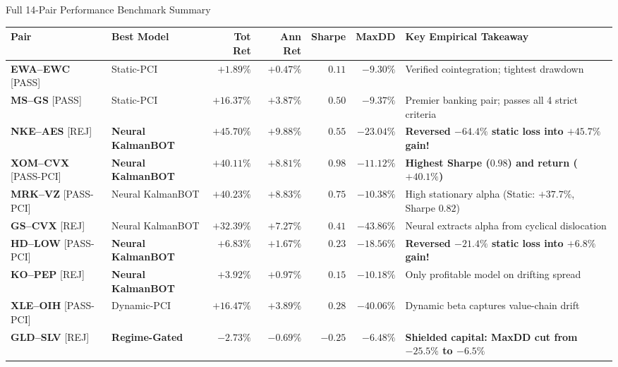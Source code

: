 \documentclass[10pt, aspectratio=169]{beamer}
\begin{document}
\begin{frame}{Full 14-Pair Performance Benchmark Summary}
  \scriptsize
  \setlength{\tabcolsep}{3pt}
  \begin{table}
    \centering
    \begin{tabular}{@{}llrrrrp{4.2cm}@{}}
      \toprule
      \textbf{Pair} & \textbf{Best Model} & \textbf{Tot Ret} & \textbf{Ann Ret} & \textbf{Sharpe} & \textbf{MaxDD} & \textbf{Key Empirical Takeaway} \\
      \midrule
      \textbf{EWA--EWC} [PASS] & Static-PCI & $\mathbf{+1.89\%}$ & $+0.47\%$ & $\mathbf{0.11}$ & $\mathbf{-9.30\%}$ & Verified cointegration; tightest drawdown \\
      \textbf{MS--GS} [PASS] & Static-PCI & $\mathbf{+16.37\%}$ & $+3.87\%$ & $\mathbf{0.50}$ & $\mathbf{-9.37\%}$ & Premier banking pair; passes all 4 strict criteria \\
      \midrule
      \textbf{NKE--AES} [REJ] & \textbf{Neural KalmanBOT} & $\mathbf{+45.70\%}$ & $+9.88\%$ & $\mathbf{0.55}$ & $\mathbf{-23.04\%}$ & \textbf{Reversed $-64.4\%$ static loss into $+45.7\%$ gain!} \\
      \textbf{XOM--CVX} [PASS-PCI] & \textbf{Neural KalmanBOT} & $\mathbf{+40.11\%}$ & $+8.81\%$ & $\mathbf{0.98}$ & $\mathbf{-11.12\%}$ & \textbf{Highest Sharpe ($0.98$) and return ($+40.1\%$)} \\
      \textbf{MRK--VZ} [PASS-PCI] & Neural KalmanBOT & $\mathbf{+40.23\%}$ & $+8.83\%$ & $0.75$ & $-10.38\%$ & High stationary alpha (Static: $+37.7\%$, Sharpe $0.82$) \\
      \textbf{GS--CVX} [REJ] & Neural KalmanBOT & $\mathbf{+32.39\%}$ & $+7.27\%$ & $0.41$ & $-43.86\%$ & Neural extracts alpha from cyclical dislocation \\
      \textbf{HD--LOW} [PASS-PCI] & \textbf{Neural KalmanBOT} & $\mathbf{+6.83\%}$ & $+1.67\%$ & $\mathbf{0.23}$ & $\mathbf{-18.56\%}$ & \textbf{Reversed $-21.4\%$ static loss into $+6.8\%$ gain!} \\
      \textbf{KO--PEP} [REJ] & \textbf{Neural KalmanBOT} & $\mathbf{+3.92\%}$ & $+0.97\%$ & $\mathbf{0.15}$ & $\mathbf{-10.18\%}$ & Only profitable model on drifting spread \\
      \midrule
      \textbf{XLE--OIH} [PASS-PCI] & Dynamic-PCI & $\mathbf{+16.47\%}$ & $+3.89\%$ & $0.28$ & $-40.06\%$ & Dynamic beta captures value-chain drift \\
      \textbf{GLD--SLV} [REJ] & \textbf{Regime-Gated} & $-2.73\%$ & $-0.69\%$ & $-0.25$ & $\mathbf{-6.48\%}$ & \textbf{Shielded capital: MaxDD cut from $-25.5\%$ to $-6.5\%$} \\

\end{tabular}
\end{table}
\end{frame}
\end{document}
